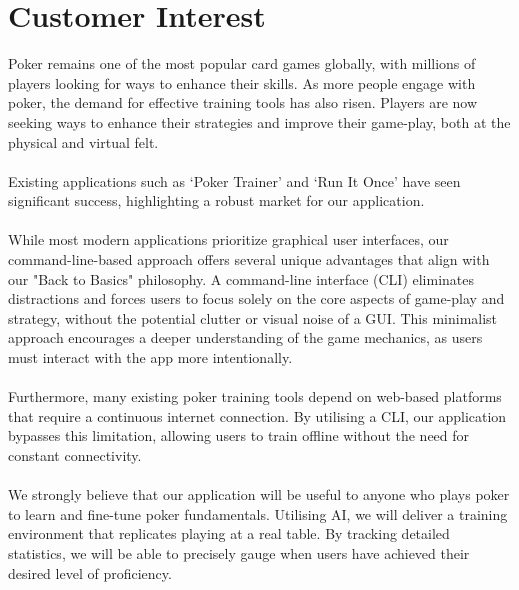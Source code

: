 \documentclass{article}
\begin{document}
\section*{Customer Interest}
Poker remains one of the most popular card games globally, with millions of players looking for ways to enhance their skills. As more people engage with poker, the demand for effective training tools has also risen. Players are now seeking ways to enhance their strategies and improve their game-play, both at the physical and virtual felt.
\\ \\
Existing applications such as `Poker Trainer' and `Run It Once' have seen significant success, highlighting a robust market for our application.
\\ \\
While most modern applications prioritize graphical user interfaces, our command-line-based approach offers several unique advantages that align with our "Back to Basics" philosophy. A command-line interface (CLI)  eliminates distractions and forces users to focus solely on the core aspects of game-play and strategy, without the potential clutter or visual noise of a GUI. This minimalist approach encourages a deeper understanding of the game mechanics, as users must interact with the app more intentionally.
\\ \\
Furthermore, many existing poker training tools depend on web-based platforms that require a continuous internet connection. By utilising a CLI, our application bypasses this limitation, allowing users to train offline without the need for constant connectivity.
\\ \\
We strongly believe that our application will be useful to anyone who plays poker to learn and fine-tune poker fundamentals. Utilising AI, we will deliver a training environment that replicates playing at a real table. By tracking detailed statistics, we will be able to precisely gauge when users have achieved their desired level of proficiency.
\end{document}
